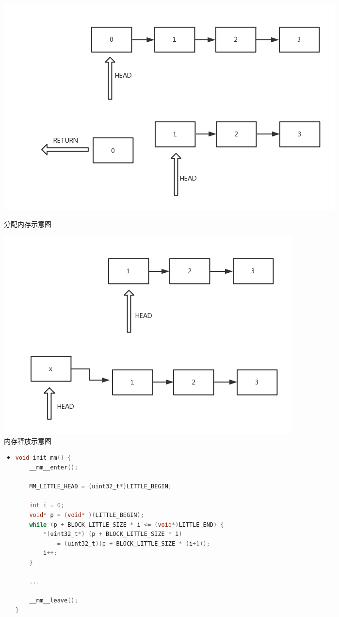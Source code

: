 \documentclass[a4paper]{article}
\begin{document}
    \begin{figure}[!hbt]
    \begin{minipage}{0.48\textwidth}
        \centering
        \includegraphics[width=\linewidth]{assets/mm.png}
    \caption{分配内存示意图} \label{fig:mm}
    \end{minipage}\hfill
    \begin{minipage}{0.48\textwidth}
        \centering
        \includegraphics[width=\linewidth]{assets/mm_free.png}
    \caption{内存释放示意图} \label{fig:mm_free}
    \end{minipage}
    \end{figure}
    \begin{figure}
    \begin{itemize}
    \item[] \begin{lstlisting}[language=C, label=lst:mm_init, caption=内存分配器的初始化]
void init_mm() {
    __mm__enter();

    MM_LITTLE_HEAD = (uint32_t*)LITTLE_BEGIN;

    int i = 0;
    void* p = (void* )(LITTLE_BEGIN);
    while (p + BLOCK_LITTLE_SIZE * i <= (void*)LITTLE_END) {
        *(uint32_t*) (p + BLOCK_LITTLE_SIZE * i) 
            = (uint32_t)(p + BLOCK_LITTLE_SIZE * (i+1));
        i++;
    }

    ...

    __mm__leave();
}
    \end{lstlisting}
    \end{itemize}
    \end{figure}
\end{document}
